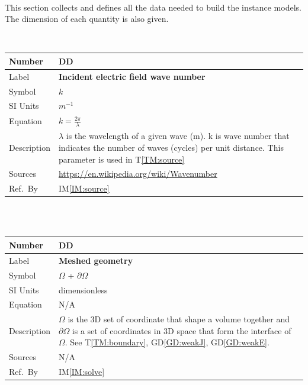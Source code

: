\documentclass[12pt]{article}
\newcommand{\colBwidth}{0.82\textwidth} \newcommand{\colCwidth}{0.1\textwidth}
\newcounter{defnum} %
\newcounter{datadefnum} %
\begin{document}
	\
	
	This section collects and defines all the data needed to build the instance
	models. The dimension of each quantity is also given.
	
	
	~\newline
	
	\noindent \begin{minipage}{\textwidth} \renewcommand*{\arraystretch}{1.5}
		\begin{tabular}{| p{\colAwidth} | p{\colBwidth}|} \hline \rowcolor[gray]{0.9}
			Number& DD{datadefnum}\thedatadefnum \label{DD:wavenumber}\\
			\hline Label& \bf Incident electric field wave number\\ \hline Symbol &$k$\\
			\hline %
			SI Units & $m^{-1}$\\ \hline Equation&$k=\frac{2\pi}{\lambda}$\\ \hline
			Description & $\lambda$ is the wavelength of a given wave (m). k is wave
			number that indicates the  number of waves (cycles) per unit distance. This
			parameter is used in T\ref{TM:source} \\ \hline Sources&
			\url{https://en.wikipedia.org/wiki/Wavenumber} \\ \hline Ref.\ By &
			IM\ref{IM:source} \\ \hline \end{tabular} \end{minipage}\\
	
	
	
	~\newline
	
	\noindent \begin{minipage}{\textwidth} \renewcommand*{\arraystretch}{1.5}
		\begin{tabular}{| p{\colAwidth} | p{\colBwidth}|} \hline \rowcolor[gray]{0.9}
			Number& DD{datadefnum}\thedatadefnum \label{DD:omega}\\ \hline
			Label& \bf Meshed geometry \\ \hline Symbol &$\Omega$ + $\partial \Omega$\\
			\hline %
			SI Units &dimensionless\\ \hline Equation& N/A \\ \hline Description &
			$\Omega$ is the 3D set of coordinate that shape a volume together and
			$\partial \Omega$ is a set of coordinates in 3D space that form the interface
			of $\Omega$. See 	T\ref{TM:boundary}, GD\ref{GD:weakJ}, GD\ref{GD:weakE}. \\
			\hline Sources& N/A\\ \hline Ref.\ By & IM\ref{IM:solve} \\ \hline
	\end{tabular} \end{minipage}\\
	
\end{document}
